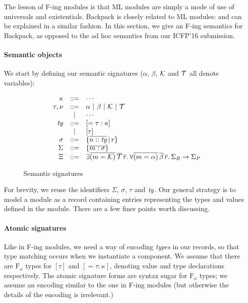 \documentclass{article}
\begin{document}
The lesson of F-ing modules is that ML modules are simply a mode of use
of universals and existentials.  Backpack is closely related to ML
modules: and can be explained in a similar fashion.
In this section, we give an F-ing semantics for Backpack, as opposed
to the ad hoc semantics from our ICFP'16 submission.

\paragraph{Semantic objects} We start by defining our semantic signatures
($\alpha$, $\beta$, $\mathcal{K}$ and $\mathcal{T}$ all denote variables):

\begin{figure}[H]
\[
\begin{array}{rcl}
\kappa &::=& \cdots \\
\tau, \nu &::=& \alpha ~|~ \beta ~|~ \mathcal{K} ~|~ \mathcal{T} \\
       & | & \cdots \\
\mathit{ty} &::=& [ = \tau : \kappa ] ~ \\
       & | & [ \tau ] \\
\sigma &::=& \{ \overline{n :: \mathit{ty}} \,|\, r \}\\
\Sigma &::=& \{ \overline{m : \sigma } \} \\
\Xi    &::=& \exists \overline{(m = \mathcal{K})}\, \overline{\mathcal{T}}\, \overline{r}.\, \forall \overline{(m = \alpha)}\, \overline{\beta}\, \overline{r}.\,
              \Sigma_R \rightarrow \Sigma_P
\end{array}
\]
\caption{Semantic signatures}
\end{figure}

\noindent
For brevity, we reuse the identifiers $\Sigma$, $\sigma$, $\tau$ and $\mathit{ty}$.
Our general strategy is to model a module as a record containing entries
representing the types and values defined in the module.  There are a few
finer points worth discussing.

\paragraph{Atomic signatures}  Like in F-ing modules, we need a way of
encoding \emph{types} in our records, so that type matching occurs when
we instantiate a component.  We assume that there are $\mathrm{F}_\omega$
types for $[\tau]$ and $[= \tau : \kappa]$, denoting value and type declarations
respectively.  The atomic signature forms are syntax sugar for $\mathrm{F}_\omega$
types; we assume an encoding similar to the one in F-ing modules (but
otherwise the details of the encoding is irrelevant.)
\end{document}
